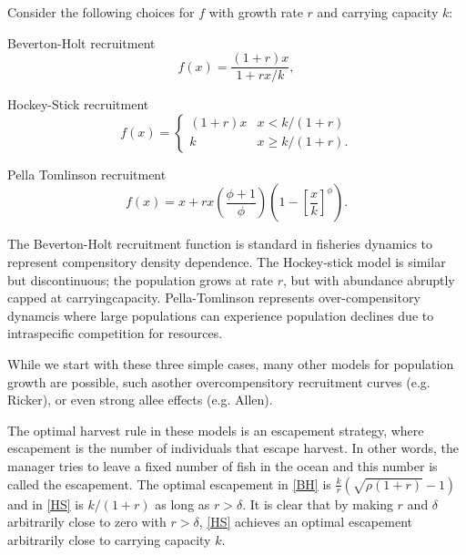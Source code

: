 \documentclass[]{elsarticle} %
\begin{document}
Consider the following choices for $f$ with growth rate $r$ and carrying capacity $k$: 

Beverton-Holt recruitment
\begin{equation}\label{BH}
f(x) = \frac{(1+r)x}{1 + rx/k}, 
\end{equation}

Hockey-Stick recruitment
\begin{equation}\label{HS}
f(x) = \begin{cases} 
(1+r)x & x < k/(1+r) \\
k & x\geq k/(1+r).
\end{cases}
\end{equation}

Pella Tomlinson recruitment
\begin{equation}\label{SA}
f(x) = x + rx\left(\frac{\phi+1}{\phi}\right)\left(1 - \left[\frac{x}{k}\right]^\phi\right). 
\end{equation}

The Beverton-Holt recruitment function is standard in fisheries dynamics to represent compensitory density dependence. The Hockey-stick model is similar but discontinuous; the population grows at rate $r$, but with abundance abruptly capped at carryingcapacity. Pella-Tomlinson represents over-compensitory dynamcis where large populations can experience population declines due to intraspecific competition for resources. 

While we start with these three simple cases, many other models for population growth are possible, such asother overcompensitory recruitment curves (e.g. Ricker), or even strong allee effects (e.g. Allen).
 
%

The optimal harvest rule in these models is an escapement strategy, where escapement is the number of individuals that escape harvest. In other words, the manager tries to leave a fixed number of fish in the ocean and this number is called the escapement. The optimal escapement in \eqref{BH} is $\frac{k}{r} ( \sqrt{ \rho (1+r) } - 1)$ and in \eqref{HS} is $k/(1+r)$ as long as $r>\delta$. It is clear that by making $r$ and $\delta$ arbitrarily close to zero with $r>\delta$, \eqref{HS} achieves an optimal escapement arbitrarily close to carrying capacity $k$. 
\end{document}
